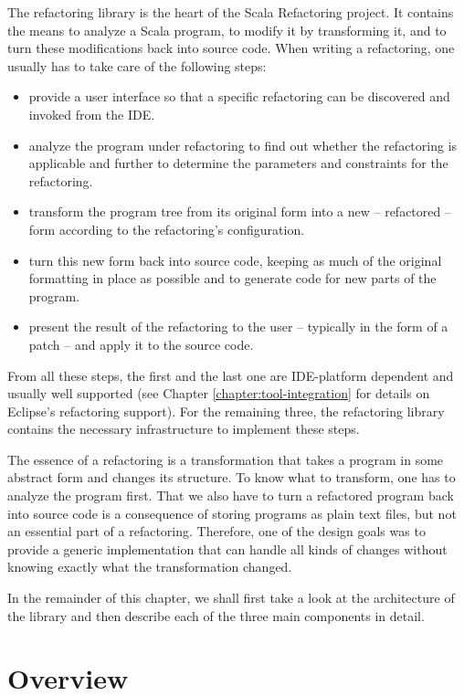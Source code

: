 
The refactoring library is the heart of the Scala Refactoring project. It contains the means to analyze a Scala program, to modify it by transforming it, and to turn these modifications back into source code. When writing a refactoring, one usually has to take care of the following steps:

\begin{itemize}
 \item provide a user interface so that a specific refactoring can be discovered and invoked from the IDE.
 \item analyze the program under refactoring to find out whether the refactoring is applicable and further to determine the parameters and constraints for the refactoring.
 \item transform the program tree from its original form into a new -- refactored -- form according to the refactoring's configuration.
 \item turn this new form back into source code, keeping as much of the original formatting in place as possible and to generate code for new parts of the program.
 \item present the result of the refactoring to the user -- typically in the form of a patch --  and apply it to the source code.
\end{itemize}

From all these steps, the first and the last one are IDE-platform dependent and usually well supported (see Chapter \ref{chapter:tool-integration} for details on Eclipse's refactoring support). For the remaining three, the refactoring library contains the necessary infrastructure to implement these steps.

The essence of a refactoring is a transformation that takes a program in some abstract form and changes its structure. To know what to transform, one has to analyze the program first. That we also have to turn a refactored program back into source code is a consequence of storing programs as plain text files, but not an essential part of a refactoring. Therefore, one of the design goals was to provide a generic implementation that can handle all kinds of changes without knowing exactly what the transformation changed.

In the remainder of this chapter, we shall first take a look at the architecture of the library and then describe each of the three main components in detail.

\section{Overview}

